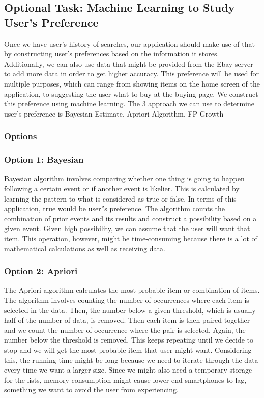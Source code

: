\documentclass[journal,compsoc, 10pt, draftclsnofoot, onecolumn]{IEEEtran}
\begin{document}
\subsection{Optional Task: Machine Learning to Study User's Preference}
Once we have user's history of searches, our application should make use of that by
constructing user's preferences based on the information it stores. Additionally, we
can also use data that might be provided from the Ebay server to add more data in
order to get higher accuracy. This preference will be used for multiple purposes,
which can range from showing items on the home screen of the application, to
suggesting the user what to buy at the buying page. We construct this preference
using machine learning.
The 3 approach we can use to determine user's preference is Bayesian Estimate,
Apriori Algorithm, FP-Growth

\subsubsection{Options}
\subsubsection*{Option 1: Bayesian}
Bayesian algorithm involves comparing whether one thing is going to happen following
a certain event or if another event is likelier. This is calculated by learning the
pattern to what is considered as true or false. In terms of this application, true
would be user''s preference. The algorithm counts the combination of prior events and
its results and construct a possibility based on a given event. Given high
possibility, we can assume that the user will want that item. This operation,
however, might be time-consuming because there is a lot of mathematical calculations
as well as receiving data.

\subsubsection*{Option 2: Apriori}
The Apriori algorithm calculates the most probable item or combination of items. The
algorithm involves counting the number of occurrences where each item is selected in
the data. Then, the number below a given threshold, which is usually half of the
number of data, is removed. Then each item is then paired together and we count the
number of occurrence where the pair is selected. Again, the number below the
threshold is removed. This keeps repeating until we decide to stop and we will get
the most probable item that user might want. Considering this, the running time might
be long because we need to iterate through the data every time we want a larger size.
Since we might also need a temporary storage for the lists, memory consumption might
cause lower-end smartphones to lag, something we want to avoid the user from
experiencing.
\end{document}
